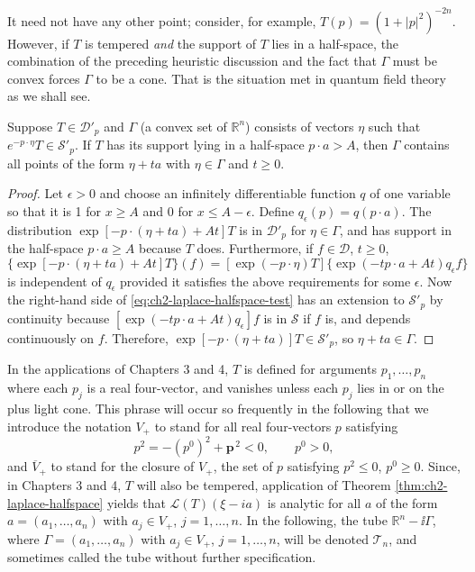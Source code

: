 It need not have any other point; consider, for example,
$T(p)=(1+|p|^2)^{-2n}$.  However, if $T$ is tempered \emph{and} the support
of $T$ lies in a half-space, the combination of the preceding heuristic
discussion and the fact that $\Gamma$ must be convex forces $\Gamma$ to be
a cone.  That is the situation met in quantum field theory as we shall see.

\begin{theorem}[2-7]\label{thm:ch2-laplace-halfspace}
Suppose $T\in\mathcal{D}'_p$ and $\Gamma$ (a convex set of $\mathbb{R}^n$)
consists of vectors $\eta$ such that $e^{-p\cdot\eta}T\in\mathcal{S}'_p$.
If $T$ has its support lying in a half-space $p\cdot a>A$, then $\Gamma$
contains all points of the form $\eta+ta$ with $\eta\in\Gamma$ and
$t\geq0$.
\end{theorem}

\begin{proof}
Let $\epsilon>0$ and choose an infinitely differentiable function $q$ of
one variable so that it is 1 for $x\geq A$ and 0 for $x\leq A-\epsilon$.
Define $q_\epsilon(p)=q(p\cdot a)$.  The distribution
$\exp[-p\cdot(\eta+ta)+At]T$ is in $\mathcal{D}'_p$ for $\eta\in\Gamma$,
and has support in the half-space $p\cdot a\geq A$ because $T$ does.
Furthermore, if $f\in\mathcal{D}$, $t\geq0$,
\begin{equation}
  \{\exp[-p\cdot(\eta+ta)+At]T\}(f)
  =[\exp(-p\cdot\eta)T]
   \{\exp(-tp\cdot a+At)q_\epsilon f\}
  \tag{2-77}\label{eq:ch2-laplace-halfspace-test}
\end{equation}
is independent of $q_\epsilon$ provided it satisfies the above requirements
for some $\epsilon$.  Now the right-hand side of \eqref{eq:ch2-laplace-halfspace-test} has an extension to
$\mathcal{S}'_p$ by continuity because
$[\exp(-tp\cdot a+At)q_\epsilon]f$ is in $\mathcal{S}$ if $f$ is, and
depends continuously on $f$.  Therefore,
$\exp[-p\cdot(\eta+ta)]T\in\mathcal{S}'_p$, so $\eta+ta\in\Gamma$.
\end{proof}

In the applications of Chapters 3 and 4, $T$ is defined for arguments
$p_1,\ldots,p_n$ where each $p_j$ is a real four-vector, and vanishes
unless each $p_j$ lies in or on the plus light cone.  This phrase will
occur so frequently in the following that we introduce the notation
$V_+$ to stand for all real four-vectors $p$ satisfying
\begin{equation*}
  p^2=-(p^0)^2+\mathbf{p}^{\,2}<0,\qquad p^0>0,
\end{equation*}
and $\overline{V}_+$ to stand for the closure of $V_+$, the set of $p$
satisfying $p^2\leq0$, $p^0\geq0$.  Since, in Chapters 3 and 4, $T$ will
also be tempered, application of Theorem \ref{thm:ch2-laplace-halfspace} yields that
$\mathcal{L}(T)(\xi-ia)$ is analytic for all $a$ of the form
$a=(a_1,\ldots,a_n)$ with $a_j\in V_+$, $j=1,\ldots,n$.  In the following,
the tube $\mathbb{R}^n-\ii\Gamma$, where $\Gamma=(a_1,\ldots,a_n)$ with
$a_j\in V_+$, $j=1,\ldots,n$, will be denoted $\mathcal{T}_n$, and
sometimes called the tube without further specification.

